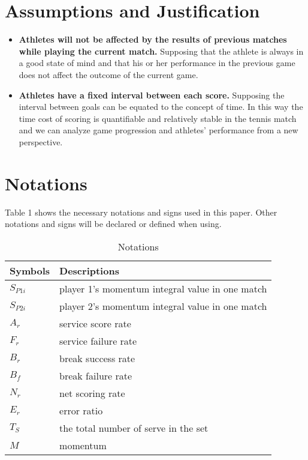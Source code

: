 \documentclass{mcmthesis}
\begin{document}
\section{Assumptions and Justification}
\begin{itemize}
    \item {\bf Athletes will not be affected by the results of previous matches while playing the
    current match.} Supposing that the athlete is always in a good state of mind and that his or her
    performance in the previous game does not affect the outcome of the current game. 
    \item {\bf Athletes have a fixed interval between each score.} Supposing the interval between goals
    can be equated to the concept of time. In this way the time cost of scoring is quantifiable and
    relatively stable in the tennis match and we can analyze game progression and athletes' performance from a new perspective.
\end{itemize}
\section{Notations}
Table 1 shows the necessary notations and signs used in this paper. Other notations and signs
will be declared or defined when using.\cite{2}

\begin{table}[htb]
    \centering
    \renewcommand{\arraystretch}{1.5} %
    \begin{tabular}{|l|l|}
    \hline
    \textbf{Symbols} & \textbf{Descriptions} \\ \hline
    $S_{P1i}$ & player 1's momentum integral value in one match \\ \hline
    $S_{P2i}$ & player 2's momentum integral value in one match \\ \hline
    $A_r$ & service score rate \\ \hline
    $F_r$ & service failure rate \\ \hline
    $B_r$ & break success rate \\ \hline
    $B_f$ & break failure rate \\ \hline
    $N_r$ & net scoring rate \\ \hline
    $E_r$ & error ratio \\ \hline
    $T_S$ & the total number of serve in the set \\ \hline
    $M$ & momentum \\ \hline
    \end{tabular}
    \caption{Notations}
    \label{Table 1:Notations}
\end{table}
\end{document}
